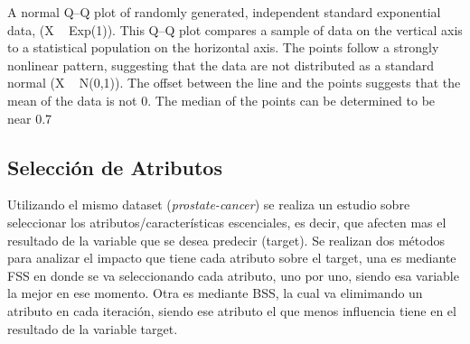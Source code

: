 \documentclass[10pt]{article}
\begin{document}
\begin{itemize}
A normal Q–Q plot of randomly generated, independent standard exponential data, (X ~ Exp(1)). This Q–Q plot compares a sample of data on the vertical axis to a statistical population on the horizontal axis. The points follow a strongly nonlinear pattern, suggesting that the data are not distributed as a standard normal (X ~ N(0,1)). The offset between the line and the points suggests that the mean of the data is not 0. The median of the points can be determined to be near 0.7

\end{itemize}

\subsection{Selección de Atributos}
Utilizando el mismo dataset (\textit{prostate-cancer}) se realiza un estudio sobre seleccionar los atributos/características escenciales, es decir, que afecten mas el resultado de la variable que se desea predecir (target). Se realizan dos métodos para analizar el impacto que tiene cada atributo sobre el target, una es mediante FSS en donde se va seleccionando cada atributo, uno por uno, siendo esa variable la mejor en ese momento. Otra es mediante BSS, la cual va elimimando un atributo en cada iteración, siendo ese atributo el que menos influencia tiene en el resultado de la variable target.
\end{document}
